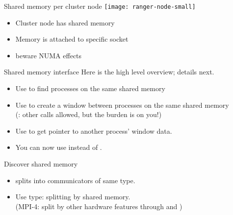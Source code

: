 \begin{numberedframe}{Shared memory per cluster node}
  \texttt{[image: ranger-node-small]}
  \begin{itemize}
  \item Cluster node has shared memory
  \item Memory is attached to specific socket
  \item beware \ac{NUMA} effects
  \end{itemize}
\end{numberedframe}

\begin{numberedframe}{Shared memory interface}
  Here is the high level overview; details next.
  \begin{itemize}
  \item Use  to find processes on the same
    shared memory
  \item Use  to create a window between
    processes on the same shared memory\\
    (: other calls allowed, but the burden is on you!)
  \item Use  to get pointer to another
    process' window data.
  \item You can now use  instead of .
  \end{itemize}
\end{numberedframe}

\begin{numberedframe}{Discover shared memory}
  \begin{itemize}
  \item
     splits into communicators of same type.
  \item Use type:  splitting by
    shared memory.\\
    (MPI-4: split by other hardware features through 
    and )
  \end{itemize}

  { 
    \renewcommand\snippetcodefraction{.4}
    \renewcommand\snippetlistfraction{.55}
    \renewcommand\snippetoutputsize{\scriptsize}
    }
\end{numberedframe}



